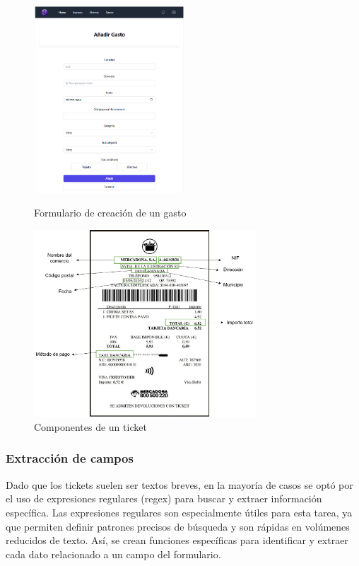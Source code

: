 \begin{figure}[ht!]
    \centering
    \begin{minipage}{0.45\textwidth}
        \centering
        \includegraphics[height = 70mm]{imagenes/formulario_gasto.png}
        \caption{Formulario de creación de un gasto}
        \label{fig:formulario_gasto}
    \end{minipage}\hfill
    \begin{minipage}{0.45\textwidth}
        \centering
        \includegraphics[height = 70mm]{imagenes/componentes_ticket.png}
        \caption{Componentes de un ticket}
        \label{fig:componentes_ticket}
    \end{minipage}
\end{figure}

\subsubsection{Extracción de campos}
Dado que los tickets suelen ser textos breves, en la mayoría de casos se optó por el uso de expresiones regulares (regex) para buscar y extraer información específica. Las expresiones regulares son especialmente útiles para esta tarea, ya que permiten definir patrones precisos de búsqueda y son rápidas en volúmenes reducidos de texto. Así, se crean funciones específicas para identificar y extraer cada dato relacionado a un campo del formulario.

